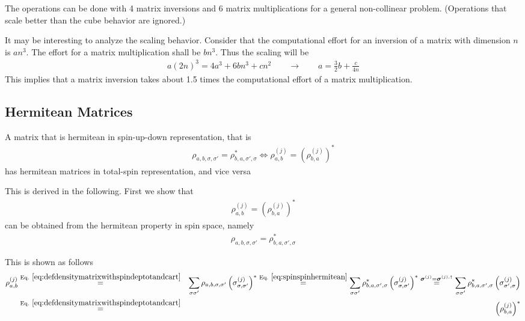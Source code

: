 \documentclass[11pt,a4paper]{report}
\begin{document}
The operations can be done with 4 matrix inversions and 6 matrix
multiplications for a general non-collinear problem. (Operations that
scale better than the cube behavior are ignored.)


It may be interesting to analyze the scaling behavior.  Consider that
the computational effort for an inversion of a matrix with dimension
$n$ is $an^3$. The effort for a matrix multiplication shall be $bn^3$.
Thus the scaling will be
\begin{eqnarray}
a(2n)^3=4a^3+6bn^3+cn^2\qquad\rightarrow\qquad a=\frac{3}{2}b+\frac{c}{4n}
\end{eqnarray}
This implies that a matrix inversion takes about 1.5 times the
computational effort of a matrix multiplication.

\subsection{Hermitean Matrices}
A matrix that is hermitean in spin-up-down representation, that is
\begin{eqnarray}
\rho_{a,b,\sigma,\sigma'}=\rho^*_{b,a,\sigma',\sigma}
\Leftrightarrow
\rho^{(j)}_{a,b}=\left(\rho^{(j)}_{b,a}\right)^*
\end{eqnarray}
has hermitean matrices in total-spin representation, and vice versa



This is derived in the following. First we show that 
\begin{eqnarray}
\rho^{(j)}_{a,b}=\left(\rho^{(j)}_{b,a}\right)^*
\label{eq:hermiteanspinorcomponents}
\end{eqnarray}
can be obtained from the hermitean property in spin space, namely
\begin{eqnarray}
\rho_{a,b,\sigma,\sigma'}=\rho^*_{b,a,\sigma',\sigma}
\label{eq:spinspinhermitean}
\end{eqnarray}

This is shown as follows
\begin{eqnarray}
\rho^{(j)}_{a,b}
&\eqrel{eq:defdensitymatrixwithspindeptotandcart}{=}&
\sum_{\sigma\sigma'}\rho_{a,b,\sigma,\sigma'}
\left(\sigma^{(j)}_{\sigma,\sigma'}\right)^*
\eqrel{eq:spinspinhermitean}{=}
\sum_{\sigma\sigma'}\rho^*_{b,a,\sigma',\sigma}
\left(\sigma^{(j)}_{\sigma,\sigma'}\right)^*
\stackrel{\mat{\sigma}^{(j)}=\mat{\sigma}^{(j),\dagger}}{=}
\sum_{\sigma\sigma'}\rho^*_{b,a,\sigma',\sigma}
\left(\sigma^{(j)}_{\sigma',\sigma}\right)
\nonumber\\
&\eqrel{eq:defdensitymatrixwithspindeptotandcart}{=}&
\left(\rho^{(j)}_{b,a}\right)^*
\end{eqnarray}
\end{document}
